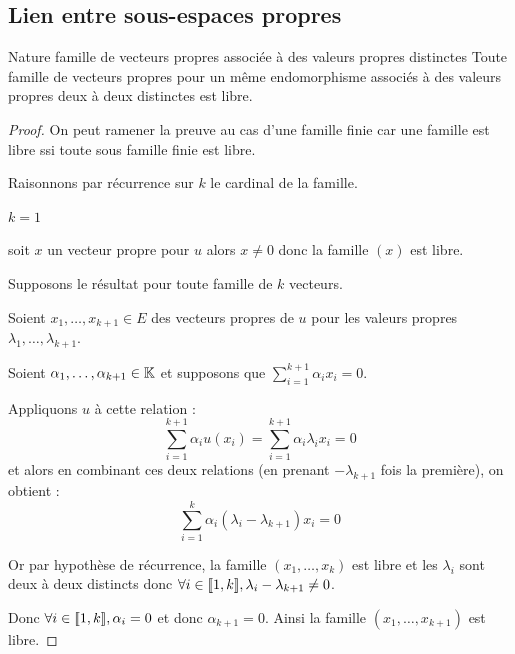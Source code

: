 \subsection{Lien entre sous-espaces propres }

\begin{theorement}{Nature famille de vecteurs propres associée à des valeurs propres distinctes}{}
    Toute famille de vecteurs propres pour un même endomorphisme 
    associés à des valeurs propres deux à deux distinctes est libre. 
\end{theorement}


\begin{proof}
    On peut ramener la preuve au cas d'une famille finie car une famille est libre 
    ssi toute sous famille finie est libre. 

    Raisonnons par récurrence sur $k$ le cardinal de la famille. 

     $k = 1$

    \svspace soit $x$ un vecteur propre pour $u$ alors $x \neq 0$ donc la famille $(x)$ est libre.

     Supposons le résultat pour toute famille de $k$ vecteurs. 

    \svspace Soient $x_1, \ldots, x_{k + 1} \in E$ des vecteurs propres de $u$ pour les 
    valeurs propres $\lambda_1, \ldots, \lambda_{k + 1}$.

    Soient $\alpha_1, \ldots, \alpha_{k + 1} \in \mathbb{K}$ et supposons que 
    $\displaystyle \sum_{i = 1}^{k + 1} \alpha_i x_i = 0$.

    Appliquons $u$ à cette relation :
    \[
        \sum_{i = 1}^{k + 1} \alpha_i u(x_i) = \sum_{i = 1}^{k + 1} \alpha_i \lambda_i x_i = 0
    \]
    et alors en combinant ces deux relations (en prenant $- \lambda_{k+1}$ fois la première), on obtient :
    \[
        \sum_{i = 1}^{k} \alpha_i (\lambda_i - \lambda_{k + 1}) x_i = 0
    \]

    Or par hypothèse de récurrence, la famille $(x_1, \ldots, x_k)$ est libre et 
    les $\lambda_i$ sont deux à deux distincts donc $\forall i \in [\![1, k]\!], \lambda_i - \lambda_{k + 1} \neq 0$.

    Donc $\forall i \in [\![1, k]\!], \alpha_i = 0$ et donc $\alpha_{k + 1} = 0$. 
    Ainsi la famille $(x_1, \ldots, x_{k + 1})$ est libre.
\end{proof}

